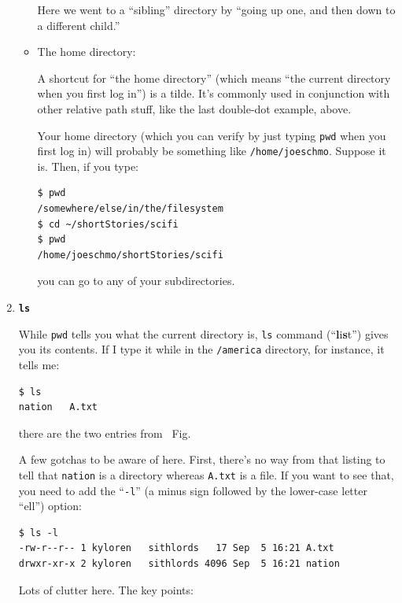 \begin{enumerate}
\begin{itemize}
Here we went to a ``sibling'' directory by ``going up one, and then down to a
different child.''

\item The home directory: \texttt{\textbf{\freakingtilde}}

A shortcut for ``the home directory'' (which means ``the current directory when
you first log in'') is a tilde. It's commonly used in conjunction with other
relative path stuff, like the last double-dot example, above.

Your home directory (which you can verify by just typing \texttt{pwd} when
you first log in) will probably be something like \texttt{/home/joeschmo}.
Suppose it is. Then, if you type:

\begin{verbatim}
$ pwd
/somewhere/else/in/the/filesystem
$ cd ~/shortStories/scifi
$ pwd
/home/joeschmo/shortStories/scifi
\end{verbatim}

you can go to any of your subdirectories.

\end{itemize}

\bigline
\item \textbf{\texttt{ls}}

While \texttt{pwd} tells you what the current directory is, \texttt{ls}
command (``\textbf{l}i\textbf{s}t'') gives you its contents. If I type it while
in the \texttt{/america} directory, for instance, it tells me:

\begin{verbatim}
$ ls
nation   A.txt
\end{verbatim}

there are the two entries from ~Fig.

A few gotchas to be aware of here. First, there's no way from that listing to
tell that \texttt{nation} is a directory whereas \texttt{A.txt} is a file. If
you want to see that, you need to add the ``\texttt{-l}'' (a minus sign
followed by the lower-case letter ``ell'') option:

\begin{verbatim}
$ ls -l
-rw-r--r-- 1 kyloren   sithlords   17 Sep  5 16:21 A.txt
drwxr-xr-x 2 kyloren   sithlords 4096 Sep  5 16:21 nation
\end{verbatim}

Lots of clutter here. The key points:



\end{enumerate}
